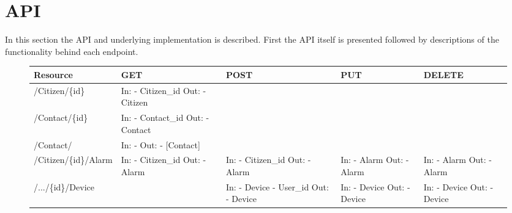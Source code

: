\section{API}
In this section the API and underlying implementation is described. First the API itself is presented followed by descriptions of the functionality behind each endpoint.

\begin{figure}[H]
    \centering
    \begin{tabular}{|l|p{2cm}|p{2cm}|p{2cm}|p{2cm}|} \hline
         Resource & GET & POST & PUT & DELETE \\ \hline
         /Citizen/\{id\} & In: \newline - Citizen\_id \newline Out:  \newline - Citizen & \cellcolor{gray!40} & \cellcolor{gray!40} & \cellcolor{gray!40} \\ \hline
         /Contact/\{id\} & In: \newline - Contact\_id \newline Out: \newline - Contact & \cellcolor{gray!40} & \cellcolor{gray!40} & \cellcolor{gray!40} \\ \hline
         /Contact/ & In: \newline - \newline Out:  \newline - [Contact] & \cellcolor{gray!40} & \cellcolor{gray!40} & \cellcolor{gray!40} \\ \hline
         /Citizen/\{id\}/Alarm & In: \newline - Citizen\_id \newline Out: \newline - Alarm & In: \newline - Citizen\_id \newline Out: \newline - Alarm & In: \newline - Alarm \newline Out: \newline - Alarm & In: \newline - Alarm \newline Out: \newline - Alarm \\ \hline
         /.../\{id\}/Device & \cellcolor{gray!40} & In: \newline - Device \newline - User\_id \newline Out: \newline - Device & In: \newline - Device \newline Out: \newline - Device & In: \newline - Device \newline Out: \newline - Device \\ \hline

\end{tabular}
\end{figure}
